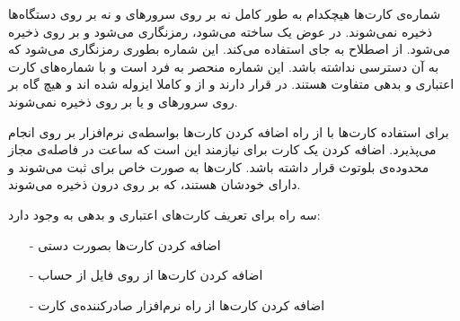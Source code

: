 \documentclass[oneside]{report}
\begin{document}
   شماره‌ی کارت‌ها هیچکدام به طور کامل نه بر روی سرور‌های 
      	{\normalsize {}} 
      	و نه بر روی دستگاه‌ها ذخیره نمی‌شوند. در عوض یک 
      	   	{\normalsize {}}
    ساخته می‌شود، رمزنگاری می‌شود و بر روی
       	{\normalsize {}}
       	ذخیره می‌شود. 
       	      	         	{\normalsize {}} 
       	      	         	از اصطلاح 
       	      	         	      	   	{\normalsize {}}
       	      	         	      	   	به جای 
       	      	      	{\normalsize {}}          	      	   	
       	      	   استفاده می‌کند.
       	این شماره بطوری رمزنگاری می‌شود که 
       	   	{\normalsize {}} به آن دسترسی نداشته باشد.
       	   	 این شماره منحصر به فرد است و با شماره‌های کارت اعتباری و بدهی متفاوت هستند. 
       	   	        	   	{\normalsize {}}
 در 
       	   	        	   	       	{\normalsize {}}
   قرار دارند و از 
          	{\normalsize {}}
          	و 
          	       	{\normalsize {}}
 کاملا ایزوله شده اند  و هیچ گاه بر روی سرورهای 
        	{\normalsize {}}
        	و یا بر روی 
        	       	{\normalsize {}}
        	       	ذخیره نمی‌شوند.        	        	    	   	        	   	 
        	       	
برای استفاده کارت‌ها با 
       	{\normalsize {}}
   از راه اضافه کردن کارت‌ها بواسطه‌ی نرم‌افزار 
          	{\normalsize {}}
          	بر روی 
          	       	{\normalsize {}}
انجام می‌پذیرد. اضافه کردن یک کارت برای 
       	{\normalsize {}} 
       	نیازمند این است که ساعت در فاصله‌ی مجاز محدوده‌ی بلوتوث قرار داشته باشد. کارت‌ها به صورت خاص برای 
       	       	{\normalsize {}} 
 ثبت می‌شوند و دارای 
          	   	        	   	{\normalsize {}}    	       	
       	خودشان هستند،  که بر روی 
       	{\normalsize {}}  
       	درون 
       	{\normalsize {}}
       	ذخیره می‌شوند.
       	
       	سه راه برای تعریف کارت‌های اعتباری و بدهی به 
       	{\normalsize {}}
       	وجود دارد: 
       \begin{itemize}
       	\item[-] اضافه کردن کارت‌ها بصورت دستی
       	\item[-] اضافه کردن کارت‌ها از روی فایل از حساب {\normalsize {}} 
       	\item[-] اضافه کردن کارت‌ها از راه نرم‌افزار صادرکننده‌ی کارت
       \end{itemize}
\end{document}
